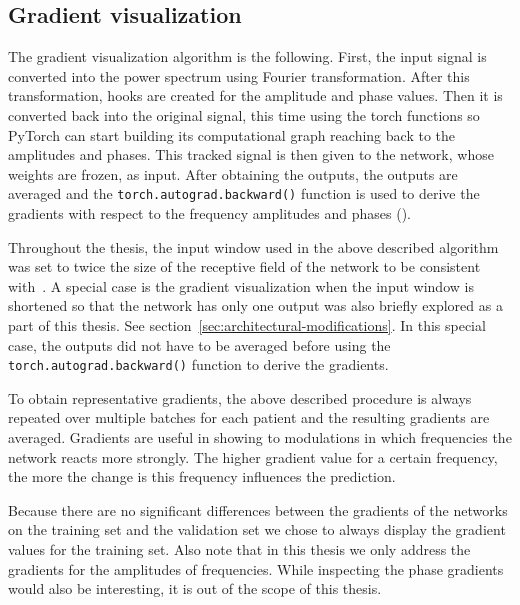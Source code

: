 \subsection{Gradient visualization}\label{subsec:gradinet-visualization}
The gradient visualization algorithm is the following.
First, the input signal is converted into the power spectrum using Fourier transformation.
After this transformation, hooks are created for the amplitude and phase values.
Then it is converted back into the original signal, this time using the torch functions so PyTorch can start building its computational graph reaching back to the amplitudes and phases.
This tracked signal is then given to the network, whose weights are frozen, as input.
After obtaining the outputs, the outputs are averaged and the \texttt{torch.autograd.backward()} function is used to derive the gradients with respect to the frequency amplitudes and phases (\cite{gradient-visualization}).

Throughout the thesis, the input window used in the above described algorithm was set to twice the size of the receptive field of the network to be consistent with~\cite{Hammer-2021}.
A special case is the gradient visualization when the input window is shortened so that the network has only one output was also briefly explored as a part of this thesis.
See section~\ref{sec:architectural-modifications}.
In this special case, the outputs did not have to be averaged before using the \texttt{torch.autograd.backward()} function to derive the gradients.

To obtain representative gradients, the above described procedure is always repeated over multiple batches for each patient and the resulting gradients are averaged.
Gradients are useful in showing to modulations in which frequencies the network reacts more strongly.
The higher gradient value for a certain frequency, the more the change is this frequency influences the prediction.
 
Because there are no significant differences between the gradients of the networks on the training set and the validation set we chose to always display the gradient values for the training set.
Also note that in this thesis we only address the gradients for the amplitudes of frequencies.
While inspecting the phase gradients would also be interesting, it is out of the scope of this thesis.

